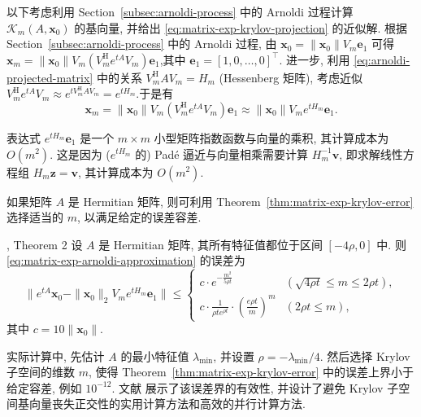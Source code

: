 {以下考虑利用 Section~\ref{subsec:arnoldi-process} 中的 Arnoldi 过程计算 $\mathcal{K}_m(A,\boldsymbol{x}_0)$ 的基向量, 并给出 \eqref{eq:matrix-exp-krylov-projection} 的近似解. 根据 Section~\ref{subsec:arnoldi-process} 中的 Arnoldi 过程, 由 $\boldsymbol{x}_0=\|\boldsymbol{x}_0\|V_m\boldsymbol{e}_1$ 可得\newline{}$\boldsymbol{x}_m=\|\boldsymbol{x}_0\|V_m(V_m^{\mathrm H}e^{tA}V_m)\boldsymbol{e}_1$,\newline{}其中 $\boldsymbol{e}_1=[1,0,\ldots,0]^{\top}$. 进一步, 利用 \eqref{eq:arnoldi-projected-matrix} 中的关系 $V_m^{\mathrm H}AV_m=H_m$ (Hessenberg 矩阵), 考虑近似\newline{}$V_m^{\mathrm H}e^{tA}V_m\approx e^{tV_m^{\mathrm H}AV_m}=e^{tH_m}$.\newline{}于是有}
\begin{equation}\label{eq:matrix-exp-arnoldi-approximation}\label{srcpage:printed-202}\boldsymbol{x}_m=\|\boldsymbol{x}_0\|V_m(V_m^{\mathrm H}e^{tA}V_m)\boldsymbol{e}_1\approx\|\boldsymbol{x}_0\|V_me^{tH_m}\boldsymbol{e}_1.\end{equation}

{表达式 $e^{tH_m}\boldsymbol{e}_1$ 是一个 $m\times m$ 小型矩阵指数函数与向量的乘积, 其计算成本为 $O(m^2)$. 这是因为 ($e^{tH_m}$ 的) Padé 逼近与向量相乘需要计算 $H_m^{-1}\boldsymbol{v}$, 即求解线性方程组 $H_m\boldsymbol{z}=\boldsymbol{v}$, 其计算成本为 $O(m^2)$.}

{如果矩阵 $A$ 是 Hermitian 矩阵, 则可利用 Theorem~\ref{thm:matrix-exp-krylov-error} 选择适当的 $m$, 以满足给定的误差容差.}

\begin{Theorem}{, Theorem 2}\label{thm:matrix-exp-krylov-error}
{设 $A$ 是 Hermitian 矩阵, 其所有特征值都位于区间 $[-4\rho,0]$ 中. 则 \eqref{eq:matrix-exp-arnoldi-approximation} 的误差为}
\[\|e^{tA}\boldsymbol{x}_0-\|\boldsymbol{x}_0\|_2V_me^{tH_m}\boldsymbol{e}_1\|\le\begin{cases}c\cdot e^{-\frac{m^2}{5\rho t}}&(\sqrt{4\rho t}\le m\le2\rho t),\\c\cdot\frac{1}{\rho te^{\rho t}}\cdot\left(\frac{e\rho t}{m}\right)^m&(2\rho t\le m),\end{cases}\]
{其中 $c=10\|\boldsymbol{x}_0\|$.}
\end{Theorem}

{实际计算中, 先估计 $A$ 的最小特征值 $\lambda_{\min}$, 并设置 $\rho=-\lambda_{\min}/4$. 然后选择 Krylov 子空间的维数 $m$, 使得 Theorem~\ref{thm:matrix-exp-krylov-error} 中的误差上界小于给定容差, 例如 $10^{-12}$. 文献  展示了该误差界的有效性, 并设计了避免 Krylov 子空间基向量丧失正交性的实用计算方法和高效的并行计算方法.}

